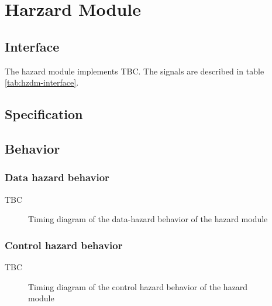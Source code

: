 \section{Harzard Module}

  \subsection{Interface}

    \begin{content}
        The hazard module implements TBC. The signals are described in table \ref{tab:hzdm-interface}. 
      \end{content}

    

  \subsection{Specification}

  \subsection{Behavior}

    \subsubsection{Data hazard behavior}

      \begin{content}
          TBC
        \end{content}

      \begin{figure}[H]
          \centering
          
          \caption{Timing diagram of the data-hazard behavior of the hazard module}
          \label{fig:hzdm-behavior-data-hazard}
        \end{figure}

    \subsubsection{Control hazard behavior}

      \begin{content}
          TBC
        \end{content}

      \begin{figure}[H]
          \centering
          
          \caption{Timing diagram of the control hazard behavior of the hazard module}
          \label{fig:hzdm-behavior-control-hazard}
        \end{figure}

\newpage
